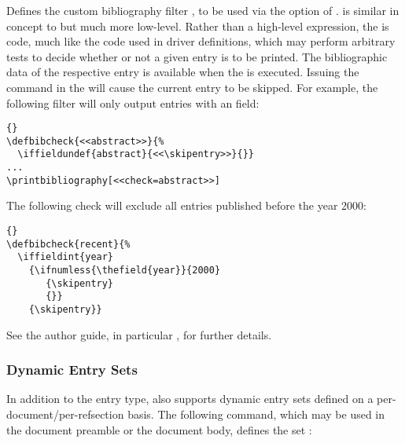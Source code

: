 \documentclass{ltxdockit}[2011/03/25]
\begin{document}
\begin{ltxsyntax}


Defines the custom bibliography filter , to be used via the  option of .  is similar in concept to  but much more low-level. Rather than a high-level expression, the  is \latex code, much like the code used in driver definitions, which may perform arbitrary tests to decide whether or not a given entry is to be printed. The bibliographic data of the respective entry is available when the  is executed. Issuing the command  in the  will cause the current entry to be skipped. For example, the following filter will only output entries with an  field:

\begin{lstlisting}[style=latex]{}
\defbibcheck{<<abstract>>}{%
  \iffieldundef{abstract}{<<\skipentry>>}{}}
...
\printbibliography[<<check=abstract>>]
\end{lstlisting}
%
The following check will exclude all entries published before the year 2000:

\begin{lstlisting}[style=latex]{}
\defbibcheck{recent}{%
  \iffieldint{year}
    {\ifnumless{\thefield{year}}{2000}
       {\skipentry}
       {}}
    {\skipentry}}
\end{lstlisting}
%
See the author guide, in particular , for further details.

\end{ltxsyntax}

\subsubsection{Dynamic Entry Sets}
\label{use:bib:set}

In addition to the  entry type,  also supports dynamic entry sets defined on a per-document\slash per-refsection basis. The following command, which may be used in the document preamble or the document body, defines the set :
\end{document}

